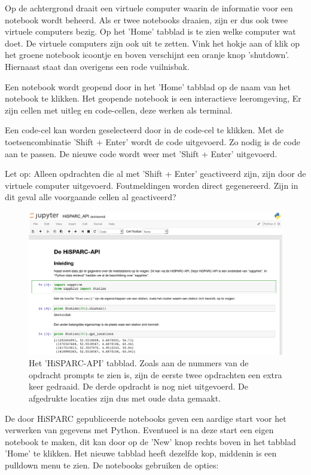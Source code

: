 Op de achtergrond draait een virtuele computer waarin de informatie voor
een notebook wordt beheerd. Als er twee notebooks draaien, zijn er dus ook twee virtuele computers bezig. Op het
'Home' tabblad is te zien welke computer wat doet. De virtuele computers zijn ook uit te zetten. Vink het hokje aan of
klik op het groene notebook icoontje en boven verschijnt een oranje knop 'shutdown'. Hiernaast staat dan overigens
een rode vuilnisbak.

Een notebook wordt geopend door in het 'Home' tabblad op de naam van het notebook te klikken. Het geopende notebook
is een interactieve leeromgeving, Er zijn cellen met uitleg en code-cellen, deze werken als terminal.

Een code-cel kan worden geselecteerd door in de code-cel te klikken. Met de toetsencombinatie 'Shift + Enter' wordt de code uitgevoerd. Zo nodig
is de code aan te passen. De nieuwe code wordt weer met 'Shift + Enter' uitgevoerd.

Let op: Alleen opdrachten die al met 'Shift + Enter' geactiveerd zijn, zijn door de virtuele computer uitgevoerd. Foutmeldingen
worden direct gegenereerd. Zijn in dit geval alle voorgaande cellen al geactiveerd?

\begin{figure}[H]
\includegraphics[width=16cm]{HiSPARC_API.png}
\caption{Het 'HiSPARC-API' tabblad. Zoals aan de nummers van de opdracht prompts te zien is, zijn de eerste twee opdrachten
een extra keer gedraaid. De derde opdracht is nog niet uitgevoerd. De afgedrukte locaties zijn dus met oude data gemaakt.}
\end{figure}

De door HiSPARC gepubliceerde notebooks geven een aardige start voor het verwerken van gegevens met Python.
Eventueel is na deze start een eigen notebook te maken, dit kan door op de 'New' knop rechts boven in het tabblad 'Home' te
klikken. Het nieuwe tabblad heeft dezelfde kop, middenin is een pulldown menu te zien. De notebooks gebruiken de opties:

